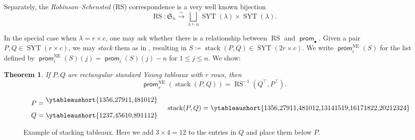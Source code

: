 \documentclass{amsart}
\newtheorem{theorem}{Theorem}[section]
\theoremstyle{definition}
\DeclareMathOperator{\RS}{RS}
\DeclareMathOperator{\SYT}{SYT}
\DeclareMathOperator{\stack}{stack}
\DeclareMathOperator{\NE}{NE}
\DeclareMathOperator{\prom}{\mathsf{prom}}
\newcommand{\too}[1]{\stackrel{#1}{\to}}
\begin{document}
Separately, the \emph{Robinson--Schensted} (RS) correspondence is a very well known bijection
\begin{equation}
  \RS \colon \mathfrak{S}_n \too{\sim} \bigsqcup_{\lambda \vdash n} \SYT(\lambda) \times \SYT(\lambda).
\end{equation}

In the special case when $\lambda = r \times c$, one may ask whether there is a relationship between $\RS$ and $\prom_\bullet$.
%
%
Given a pair $P, Q \in \SYT(r \times c)$, we may \emph{stack} them as in , resulting in $S \coloneqq \stack(P, Q) \in \SYT(2r \times c)$. We write $\prom_i^{\NE}(S)$ for the list defined by $\prom_i^{\NE}(S)(j) = \prom_i(S)(j)-n$ for $1 \leq j \leq n$. We show:

\begin{theorem}\label{thm:prom-RS}
    If $P, Q$ are rectangular standard Young tableaux with $r$ rows, then
    \begin{equation}\label{eq:prom-RS}
        \prom_r^{\NE}(\stack(P, Q)) = \RS^{-1}(Q^\top, P^\top).
    \end{equation}
\end{theorem}

\begin{figure}[hbtp]
    \[
        \begin{array}{cc}
        \begin{array}{c}
        P = \vcenter{\hbox{\ytableaushort{1356,279{11},48{10}{12}}\vspace{1em}}} \\[6pt]
        Q = \vcenter{\hbox{\ytableaushort{1237,456{10},89{11}{12}}}}
        \end{array}
        &
        \stack(P, Q) = \vcenter{\hbox{\ytableaushort{1356,279{11},48{10}{12},{13}{14}{15}{19},{16}{17}{18}{22},{20}{21}{23}{24}}}}
        \end{array}
    \]
    \caption{Example of stacking tableaux. Here we add $3 \times 4 = 12$ to the entries in $Q$ and place them below $P$.}
    \label{fig:stacking-example}
\end{figure}
\end{document}
